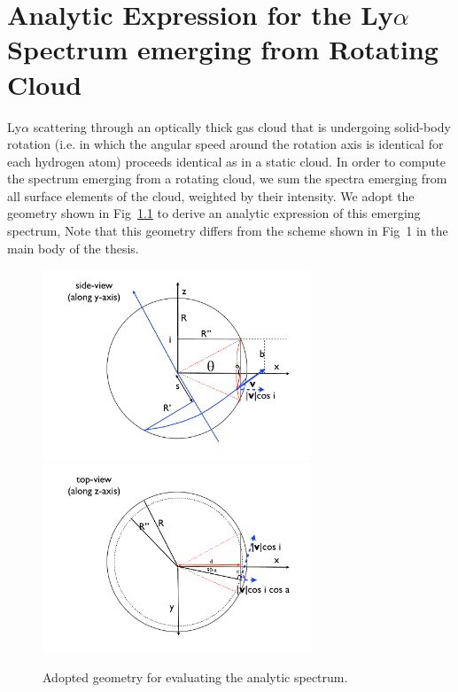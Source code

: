 
\chapter{Analytic Expression for the Ly$\alpha$ Spectrum emerging from Rotating Cloud}\label{sec:app} %


Ly$\alpha$ scattering through an optically thick gas cloud that is
undergoing solid-body rotation (i.e. in which the angular speed around the
rotation axis is identical for each hydrogen atom) proceeds identical
as in a static cloud. In order to compute the spectrum emerging from a rotating cloud, we sum
the spectra emerging from all surface elements of the cloud, weighted by their intensity.
We adopt the geometry shown in Fig~\ref{fig:scheme} to derive an analytic expression of this emerging spectrum,
Note that this geometry differs from the scheme shown in Fig~1 in the main body of
the thesis.
%
\begin{figure}[h]
\centerline{\includegraphics[width=80mm]{../Figures/fig11a.pdf}
\includegraphics[width=80mm]{../Figures/fig11b.pdf}}
\caption[]{Adopted geometry for evaluating the analytic spectrum.}
\label{fig:scheme}
\end{figure}
